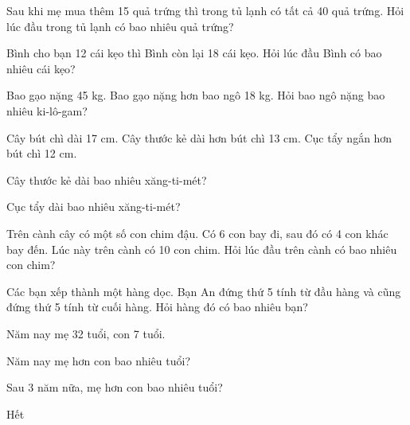 \documentclass[../main.tex]{subfiles}
\begin{document}
\begin{bt}
    Sau khi mẹ mua thêm 15 quả trứng thì trong tủ lạnh có tất cả 40 quả trứng. Hỏi lúc đầu trong tủ lạnh có bao nhiêu quả trứng?
\end{bt}

\begin{bt}
    Bình cho bạn 12 cái kẹo thì Bình còn lại 18 cái kẹo. Hỏi lúc đầu Bình có bao nhiêu cái kẹo?
\end{bt}

\begin{bt}
    Bao gạo nặng 45 kg. Bao gạo nặng hơn bao ngô 18 kg. Hỏi bao ngô nặng bao nhiêu ki-lô-gam?\par
\end{bt}

\begin{bt}
    Cây bút chì dài 17 cm. Cây thước kẻ dài hơn bút chì 13 cm. Cục tẩy ngắn hơn bút chì 12 cm.
    \begin{listEX}
        \item Cây thước kẻ dài bao nhiêu xăng-ti-mét?
        \item Cục tẩy dài bao nhiêu xăng-ti-mét?
    \end{listEX}
\end{bt}
\providecommand{\TTnguon}{}\renewcommand{\TTnguon}[1]{{\small\itshape\color{black!55}(#1)}}
\newpage
\begin{bt}
    Trên cành cây có một số con chim đậu. Có 6 con bay đi, sau đó có 4 con khác bay đến. Lúc này trên cành có 10 con chim. Hỏi lúc đầu trên cành có bao nhiêu con chim?
\end{bt}

\begin{bt}
    Các bạn xếp thành một hàng dọc. Bạn An đứng thứ 5 tính từ đầu hàng và cũng đứng thứ 5 tính từ cuối hàng. Hỏi hàng đó có bao nhiêu bạn?
\end{bt}

\begin{bt}
    Năm nay mẹ 32 tuổi, con 7 tuổi.
    \begin{listEX}
        \item Năm nay mẹ hơn con bao nhiêu tuổi?
        \item Sau 3 năm nữa, mẹ hơn con bao nhiêu tuổi?
    \end{listEX}
\end{bt}


\begin{center}
       \faGg\faGg\quad Hết \quad\faGg\faGg
\end{center}
\end{document}

